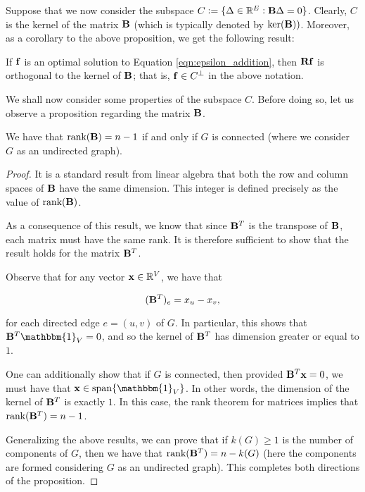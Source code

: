 \documentclass[11pt]{article}
\begin{document}
Suppose that we now consider the subspace $C:= \{ \Delta \in \rea^E: \V{B}\Delta =0\}$. Clearly,
$C$ is the kernel of the matrix $\V{B}$ (which is typically denoted by $\text{ker}(\V{B}))$. Moreover, as a corollary to the above proposition,
we get the following result:

\begin{corollary}

If $\V{f}$ is an optimal solution to Equation \ref{eqn:epsilon_addition}, then $\V{Rf}$
is orthogonal to the kernel of $\V{B}$; that is, $\V{f} \in C^{\perp}$ in the above
notation.

\end{corollary}

We shall now consider some properties of the subspace $C$. Before doing so,
let us observe a proposition regarding the matrix $\V{B}$.

\begin{proposition}

We have that $\text{rank}(\V{B})= n-1$ if and only if $G$ is connected (where
we consider $G$ as an undirected graph).

\end{proposition}

\begin{proof}

It is a standard result from linear algebra that both the row and column spaces of $\V{B}$
have the same dimension. This integer is defined precisely as the value of $\text{rank}(\V{B})$.

As a consequence of this result, we know that since $\V{B}^{T}$ is the transpose of $\V{B}$,
each matrix must have the same rank. It is therefore sufficient to show that the result holds
for the matrix $\V{B}^{T}$.

Observe that for any vector $\V{x} \in \rea^V$, we have that 

\[
	(\V{B}^{T})_{e} = x_{u} -x_{v},
\]

for each directed edge $e=(u,v)$ of $G$. In particular, this shows that
$\V{B}^{T} \mathbbm{1}_{V} =0$, and so the kernel of $\V{B}^{T}$
has dimension greater or equal to $1$. 

One can additionally show that if $G$ is connected,
then provided $\V{B}^{T}\V{x}=0$, we must have that $\V{x} \in \text{span}\{ \mathbbm{1}_{V} \}$.
In other words, the dimension of the kernel of $\V{B}^{T}$ is exactly $1$. In this case, 
the rank theorem for matrices implies that $\text{rank}(\V{B}^{T})=n-1$.

Generalizing the above results, we can prove that if $k(G) \ge 1$ is the number of components
of $G$, then we have that $\text{rank}(\V{B}^{T})=n-k(G)$ (here the components are formed
considering $G$ as an undirected graph). This completes both directions
of the proposition.

\end{proof}
\end{document}
